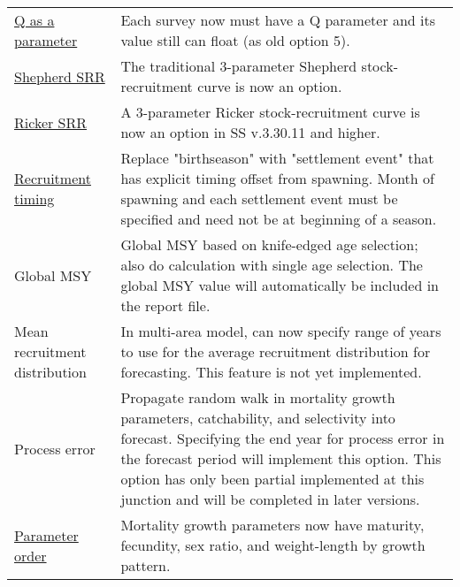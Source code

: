 \begin{center}
{\begin{longtable}{p{1.75cm} p{9.5cm}}
		\multicolumn{1}{l}{\hyperlink{Qsetup}{Q as a parameter}} & 
				Each survey now must have a Q parameter and its value still can float (as old option 5).\\

		\multicolumn{1}{l}{\hyperlink{Shepherd}{Shepherd SRR}} & 
				The traditional 3-parameter Shepherd stock-recruitment curve is now an option.\\

			
		\multicolumn{1}{l}{\hyperlink{Ricker2}{Ricker SRR}} & 
				A 3-parameter Ricker stock-recruitment curve is now an option in SS v.3.30.11 and higher.\\

		\multicolumn{1}{l}{\hyperlink{RecrTiming}{Recruitment timing}} & 
				Replace "birthseason" with "settlement event" that has explicit timing offset from spawning. Month of spawning and each settlement event must be specified and need not be at beginning of a season.\\

		\multicolumn{1}{l}{Global MSY} &  
				Global MSY based on knife-edged age selection; also do calculation with single age selection. The global MSY value will automatically be included in the report file.\\
		
		\multicolumn{1}{l}{ Mean recruitment distribution} & 
				In multi-area model, can now specify range of years to use for the average recruitment distribution for forecasting. This feature is not yet implemented. \\

		\multicolumn{1}{l}{Process error} & 
				Propagate random walk in mortality growth parameters, catchability, and selectivity into forecast. Specifying the end year for process error in the forecast period will implement this option.  This option has only been partial implemented at this junction and will be completed in later versions.\\

		\multicolumn{1}{l}{\hyperlink{MGorder}{Parameter order}} & 
				Mortality growth parameters now have maturity, fecundity, sex ratio, and weight-length by growth pattern.\\
				

\end{longtable}}
\end{center}
